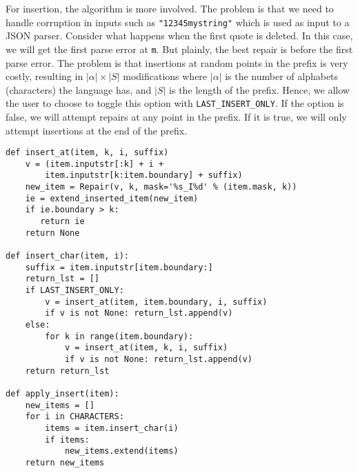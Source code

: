\documentclass[sigconf,review,anonymous]{acmart}
\def\<#1>{\texttt{#1}}
\newcommand{\brepair}{\textsc{FSynth}\xspace}
\begin{document}
For insertion, the algorithm is more involved. The problem is that we need to
handle corruption in inputs such as \<"12345mystring"> which is used as input
to a JSON parser. Consider what happens when the first quote is deleted. In this
case, we will get the first parse error at \<m>. But plainly, the best repair
is before the first parse error. The problem is that insertions at random
points in the prefix is very costly, resulting in $|\alpha| \times |S|$
modifications where $|\alpha|$ is the number of alphabets (characters) the
language has, and $|S|$ is the length of the prefix.
Hence, we allow the user to choose to toggle this option with
\<LAST\_INSERT\_ONLY>. If the option is false, we will attempt repairs at any
point in the prefix. If it is true, we will only attempt insertions at the end
of the prefix.
\begin{lstlisting}[caption=\brepair repairs,label={lst:repairs}]
def insert_at(item, k, i, suffix)
    v = (item.inputstr[:k] + i +
        item.inputstr[k:item.boundary] + suffix)
    new_item = Repair(v, k, mask='%s_I%d' % (item.mask, k))
    ie = extend_inserted_item(new_item)
    if ie.boundary > k:
       return ie
    return None

def insert_char(item, i):
    suffix = item.inputstr[item.boundary:]
    return_lst = []
    if LAST_INSERT_ONLY:
        v = insert_at(item, item.boundary, i, suffix)
        if v is not None: return_lst.append(v)
    else:
        for k in range(item.boundary):
            v = insert_at(item, k, i, suffix)
            if v is not None: return_lst.append(v)
    return return_lst

def apply_insert(item):
    new_items = []
    for i in CHARACTERS:
        items = item.insert_char(i)
        if items:
            new_items.extend(items)
    return new_items
\end{lstlisting}
\end{document}
